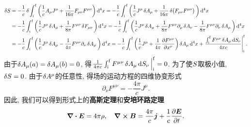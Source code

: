 \begin{align*}
    \var{\action} &= -\frac{1}{c} \var{\int_{\init}^{\fini} \bigg(\frac{1}{c} A_{\mu} J^{\mu} + \frac{1}{16 \pi} F_{\mu\nu} F^{\mu\nu} \bigg) \dd[4]{x}}
    = -\frac{1}{c} \int_{\init}^{\fini} \bigg(\frac{1}{c} J^{\mu}\var{A_{\mu}} + \frac{1}{16 \pi} \var{\big(F_{\mu\nu} F^{\mu\nu}\big)} \bigg) \dd[4]{x} \\
    &= -\frac{1}{c} \int_{\init}^{\fini} \bigg(\frac{1}{c} J^{\mu}\var{A_{\mu}} + \frac{1}{8 \pi} F^{\mu\nu} \var{F_{\mu\nu}} \bigg) \dd[4]{x} = -\frac{1}{c} \int_{\init}^{\fini} \bigg(\frac{1}{c} J^{\mu}\var{A_{\mu}} + \frac{1}{8 \pi} F^{\mu\nu} \partial_{\mu} \var{A_{\nu}} - \frac{1}{8 \pi} F^{\mu\nu} \partial_{\nu} \var{A_{\mu}} \bigg) \dd[4]{x}\\
    &= -\frac{1}{c} \int_{\init}^{\fini} \bigg(\frac{1}{c} J^{\mu}\var{A_{\mu}} - \frac{1}{4 \pi} F^{\mu\nu} \partial_{\nu} \var{A_{\mu}} \bigg) \dd[4]{x} = -\frac{1}{c} \int_{\init}^{\fini} \bigg(\frac{1}{c} J^{\mu} + \frac{1}{4 \pi} \pdv{F^{\mu\nu}}{x^{\nu}} \bigg) \var{A_{\mu}} \dd[4]{x} +\eval{\frac{\int_{\init}^{\fini} F^{\mu\nu} \var{A_{\mu}} \dd{S_{\nu}}}{4\pi c}}_{\init}^{\fini}.
\end{align*}
由于$ \var{A_{\mu}(a)}=\var{A_{\mu}(b)}=0 $, 得$ \eval{\frac{1}{4\pi c} \int_{\init}^{\fini} F^{\mu\nu} \var{A_{\mu}} \dd{S_{\nu}}}_{\init}^{\fini}=0 $. 为了使$ S $取极小值, $ \var{S}=0 $. 由于$ \var{A^{\mu}} $的任意性, 得场的运动方程的四维协变形式
\begin{equation}
    \partial_{\nu} F^{\mu\nu} = -\frac{4\pi}{c} J^{\mu}.
\end{equation}
因此, 我们可以得到形式上的\textbf{高斯定理}和\textbf{安培环路定理}
\begin{equation}
    \div{\vb*{E}} = 4\pi\rho, \quad \curl{\vb*{B}} = \frac{4\pi}{c} \vb*{j} + \frac{1}{c} \pdv{\vb*{E}}{t}.
\end{equation}

